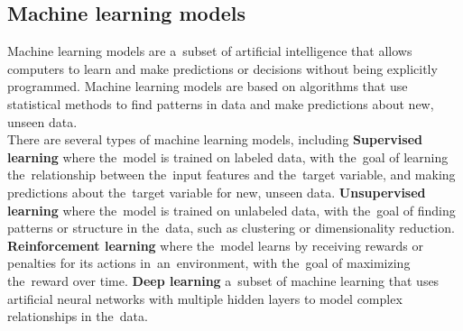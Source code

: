 \subsection{Machine learning models}\label{sec:ml}
Machine learning models are a~subset of artificial intelligence that allows computers to learn and make
predictions or decisions without being explicitly programmed. Machine learning models are based on algorithms
that use statistical methods to find patterns in data and make predictions about new, unseen data.
\\
There are several types of machine learning models, including \textbf{Supervised learning} where the~model is trained on labeled data, with the~goal of learning the~relationship between the~input features and the~target variable, and making predictions about the~target variable for new, unseen data.
\textbf{Unsupervised learning} where the~model is trained on unlabeled data, with the~goal of finding patterns or structure in the~data, such as clustering or dimensionality reduction. \textbf{Reinforcement learning} where the~model learns by receiving rewards or penalties for its actions in~an~environment, with the~goal of maximizing the~reward over time. \textbf{Deep learning} a~subset of machine learning that uses artificial neural networks with multiple hidden layers to model complex relationships in the~data. 

